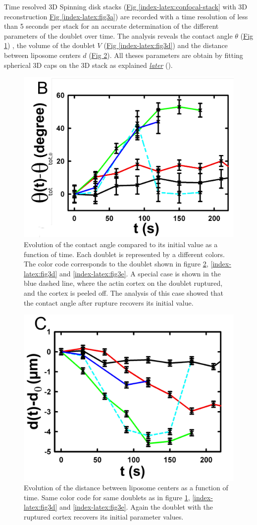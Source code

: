 \documentclass[A4paperpaper,11pt,english]{sphinxmanual}
\begin{document}
Time resolved 3D Spinning disk stacks (\hyperref[index-latex:confocal-stack]{Fig  \ref*{index-latex:confocal-stack}} with 3D reconstruction
\hyperref[index-latex:fig3a]{Fig  \ref*{index-latex:fig3a}}) are recorded with a time resolution of less than 5 seconds per stack for an accurate determination of the different
parameters of the doublet over time. The analysis reveals the contact angle \(\theta\) (\hyperref[index-latex:fig3b]{Fig  \ref*{index-latex:fig3b}}) , the
volume of the doublet \(V\) (\hyperref[index-latex:fig3d]{Fig  \ref*{index-latex:fig3d}}) and the distance between liposome
centers \(d\) (\hyperref[index-latex:fig3c]{Fig  \ref*{index-latex:fig3c}}). All theses parameters are obtain by
fitting spherical 3D caps on the 3D stack as explained {\hyperref[index-latex:full3dfit]{\emph{later}}} ().
\begin{figure}[htbp]
\centering
\capstart

\includegraphics[width=0.500\linewidth]{Fig_03-B.png}
\caption{Evolution of the contact angle compared to its initial value as a function of
time.  Each doublet is represented by a different colors. The color code corresponds to the doublet
shown in figure \hyperref[index-latex:fig3c]{ \ref*{index-latex:fig3c}}, \hyperref[index-latex:fig3d]{ \ref*{index-latex:fig3d}}
and \hyperref[index-latex:fig3e]{ \ref*{index-latex:fig3e}}. A special case is shown in the blue dashed line,
where the actin cortex on the doublet ruptured, and the cortex is peeled off.
The analysis of this case showed that the contact angle after rupture recovers its initial value.}\label{index-latex:fig3b}\end{figure}
\begin{figure}[htbp]
\centering
\capstart

\includegraphics[width=0.500\linewidth]{Fig_03-C.png}
\caption{Evolution of the distance between liposome centers as a function of time.
Same color code for same doublets as in figure \hyperref[index-latex:fig3b]{ \ref*{index-latex:fig3b}}, \hyperref[index-latex:fig3d]{ \ref*{index-latex:fig3d}}
and \hyperref[index-latex:fig3e]{ \ref*{index-latex:fig3e}}. Again the doublet with the ruptured cortex recovers its initial parameter values.}\label{index-latex:fig3c}\end{figure}
\end{document}
